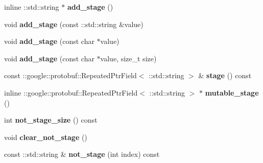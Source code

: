 \begin{DoxyCompactItemize}
\item 
\mbox{\label{classcaffe_1_1_net_state_rule_a069611ac90ef8e803620e47ee43ad1cd}} 
inline \+::std\+::string $\ast$ {\bfseries add\+\_\+stage} ()
\item 
\mbox{\label{classcaffe_1_1_net_state_rule_aa1c7ffd0d21e01191e810c263c11d284}} 
void {\bfseries add\+\_\+stage} (const \+::std\+::string \&value)
\item 
\mbox{\label{classcaffe_1_1_net_state_rule_a4d11adaa0f0cc56cd4888352c97f9a1d}} 
void {\bfseries add\+\_\+stage} (const char $\ast$value)
\item 
\mbox{\label{classcaffe_1_1_net_state_rule_a0ebb858bad148a6e4040bed5be1773b8}} 
void {\bfseries add\+\_\+stage} (const char $\ast$value, size\+\_\+t size)
\item 
\mbox{\label{classcaffe_1_1_net_state_rule_ad55144f8568c1a0776e2ee5ff99138a7}} 
const \+::google\+::protobuf\+::\+Repeated\+Ptr\+Field$<$ \+::std\+::string $>$ \& {\bfseries stage} () const
\item 
\mbox{\label{classcaffe_1_1_net_state_rule_a079699bfeb56e8494e5c8d7cd815c1ec}} 
inline \+::google\+::protobuf\+::\+Repeated\+Ptr\+Field$<$ \+::std\+::string $>$ $\ast$ {\bfseries mutable\+\_\+stage} ()
\item 
\mbox{\label{classcaffe_1_1_net_state_rule_a667cddaa4c964d14c25f207d49e54b6a}} 
int {\bfseries not\+\_\+stage\+\_\+size} () const
\item 
\mbox{\label{classcaffe_1_1_net_state_rule_a69e70bd95221d61e3088915a8bbf4f50}} 
void {\bfseries clear\+\_\+not\+\_\+stage} ()
\item 
\mbox{\label{classcaffe_1_1_net_state_rule_ad10c7f6f43f3c8dba11fd9755b5705d1}} 
const \+::std\+::string \& {\bfseries not\+\_\+stage} (int index) const
\item 
\mbox{\label{classcaffe_1_1_net_state_rule_a04cc28c6402511f2fdac981b6952e93d}} 

\end{DoxyCompactItemize}
